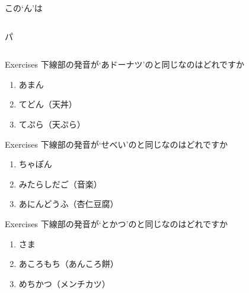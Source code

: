 \documentclass[aspectratio=169,xcolor={dvipsnames,table}]{beamer}
\begin{document}
\begin{frame}[plain]{この`ん'は}\Huge

\begin{columns}
 \begin{column}{.3\textwidth}
 パ
 \end{column}
\begin{column}{.6\textwidth}
\end{column}
\end{columns}
\end{frame}
\begin{frame}[plain]{Exercises}
下線部の発音が`あドーナツ'のと同じなのはどれですか

\begin{enumerate}
 \item あまん
 \item てどん（天丼）
 \item てぷら（天ぷら）

\end{enumerate}
\end{frame}

\begin{frame}[plain]{Exercises}
下線部の発音が`せべい'のと同じなのはどれですか

\begin{enumerate}
 \item ちゃぽん
 \item みたらしだご（音楽）
 \item あにんどうふ（杏仁豆腐）

\end{enumerate}
\end{frame}
\begin{frame}[plain]{Exercises}
下線部の発音が`とかつ'のと同じなのはどれですか

\begin{enumerate}
 \item さま
 \item あころもち（あんころ餅）
 \item めちかつ（メンチカツ）

\end{enumerate}
\end{frame}
\end{document}
